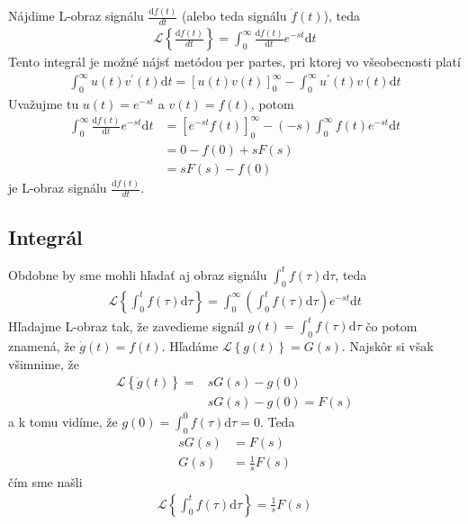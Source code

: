 \documentclass[a4paper, 10pt, ]{article}
\begin{document}
Nájdime L-obraz signálu $\frac{\text{d}f(t)}{dt}$ (alebo teda signálu $\dot f(t)$), teda
\begin{align}
    \mathcal L \left\{ \frac{\text{d}f(t)}{dt} \right\} = \int_0^\infty \frac{\text{d}f(t)}{\text{d}t} e^{-st}\text{d}t
\end{align}
Tento integrál je možné nájsť metódou per partes, pri ktorej vo všeobecnosti platí
\begin{align}
    \int_0^\infty u(t)v^\prime(t)\text{d}t = \left[ u(t)v(t) \right]_0^\infty - \int_0^\infty u^\prime(t) v(t) \text{d}t
\end{align}
Uvažujme tu $u(t) = e^{-st}$ a $v(t) = f(t)$, potom
\begin{equation}
    \begin{aligned}
        \int_0^\infty \frac{\text{d}f(t)}{\text{d}t} e^{-st}\text{d}t
            &=  \left[ e^{-st} f(t) \right]_0^\infty - (-s)  \int_0^\infty f(t) e^{-st}\text{d}t \\
            &= 0 - f(0) + s F(s) \\
            &= s F(s) - f(0)
    \end{aligned}
\end{equation}
je L-obraz signálu $\frac{\text{d}f(t)}{dt}$.






\subsection{Integrál}

Obdobne by sme mohli hľadať aj obraz signálu $\int_0^t f(\tau) \text{d}\tau$, teda
\begin{align}
    \mathcal L \left\{ \int_0^t f(\tau) \text{d}\tau \right\} = \int_0^\infty \left(\int_0^t f(\tau) \text{d}\tau \right) e^{-st}\text{d}t
\end{align}
Hľadajme L-obraz tak, že zavedieme signál $g(t) = \int_0^t f(\tau) \text{d}\tau$ čo potom znamená, že $\dot g(t) = f(t)$. Hľadáme $\mathcal L \left\{ g(t) \right\} = G(s)$. Najskôr si však všimnime, že
\begin{equation}
    \begin{aligned}
        \mathcal L \left\{ \dot g(t) \right\} =& s G(s) - g(0) \\
        & s G(s) - g(0) = F(s)
    \end{aligned}
\end{equation}
a k tomu vidíme, že $g(0) = \int_0^0 f(\tau) \text{d}\tau = 0$. Teda
\begin{subequations}
    \begin{align}
        sG(s) &= F(s) \\
        G(s) &= \frac{1}{s} F(s)
    \end{align}
\end{subequations}
čím sme našli
\begin{align}
    \mathcal L \left\{ \int_0^t f(\tau) \text{d}\tau \right\} = \frac{1}{s} F(s)
\end{align}
\end{document}
